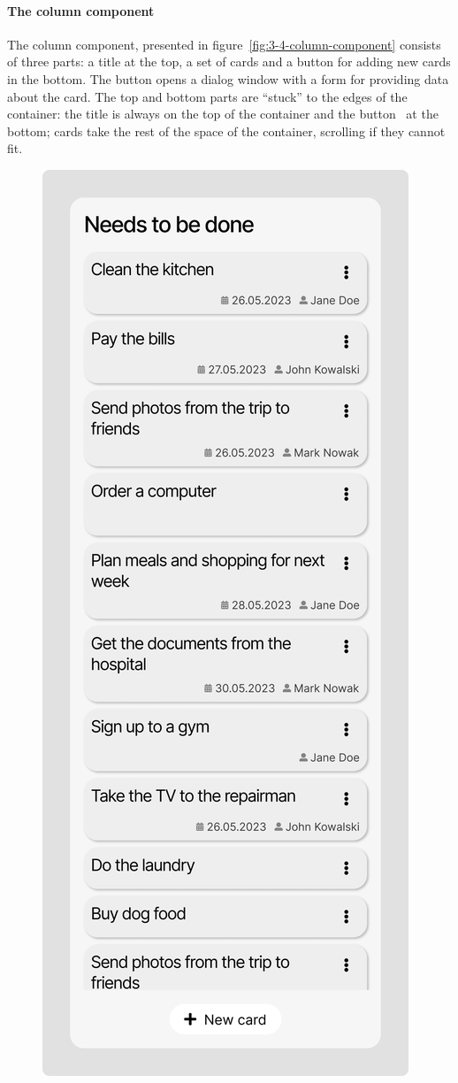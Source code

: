 
\paragraph{The column component}
The column component, presented in figure~\ref{fig:3-4-column-component} consists of three parts: a title at the top, a set of cards and a button for adding new cards in the bottom.
The button opens a dialog window with a form for providing data about the card.
The top and bottom parts are \enquote{stuck} to the edges of the container: the title is always on the top of the container and the button \textendash\ at the bottom;
cards take the rest of the space of the container, scrolling if they cannot fit.

\begin{figure}
    \centering
    \includegraphics[height=0.5\textheight]{./3-research-methodology/column-component}

\end{figure}
